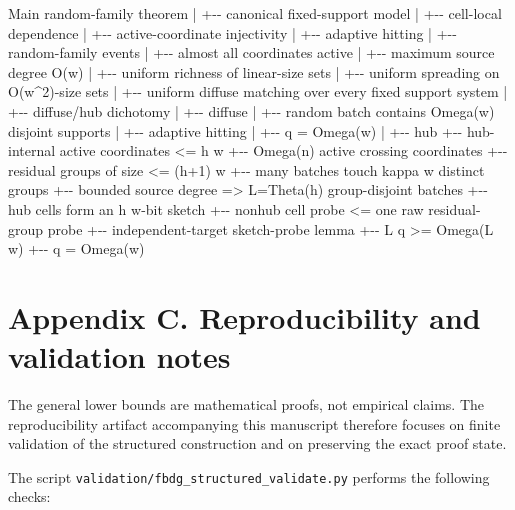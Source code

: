 \documentclass[
]{article}
\newenvironment{Shaded}{}{}
\newcommand{\NormalTok}[1]{#1}
\begin{document}
\begin{Shaded}
\begin{Highlighting}[]
\NormalTok{Main random{-}family theorem}
\NormalTok{|}
\NormalTok{+{-}{-} canonical fixed{-}support model}
\NormalTok{|   +{-}{-} cell{-}local dependence}
\NormalTok{|   +{-}{-} active{-}coordinate injectivity}
\NormalTok{|   +{-}{-} adaptive hitting}
\NormalTok{|}
\NormalTok{+{-}{-} random{-}family events}
\NormalTok{|   +{-}{-} almost all coordinates active}
\NormalTok{|   +{-}{-} maximum source degree O(w)}
\NormalTok{|   +{-}{-} uniform richness of linear{-}size sets}
\NormalTok{|   +{-}{-} uniform spreading on O(w\^{}2){-}size sets}
\NormalTok{|   +{-}{-} uniform diffuse matching over every fixed support system}
\NormalTok{|}
\NormalTok{+{-}{-} diffuse/hub dichotomy}
\NormalTok{    |}
\NormalTok{    +{-}{-} diffuse}
\NormalTok{    |   +{-}{-} random batch contains Omega(w) disjoint supports}
\NormalTok{    |   +{-}{-} adaptive hitting}
\NormalTok{    |   +{-}{-} q = Omega(w)}
\NormalTok{    |}
\NormalTok{    +{-}{-} hub}
\NormalTok{        +{-}{-} hub{-}internal active coordinates \textless{}= h w}
\NormalTok{        +{-}{-} Omega(n) active crossing coordinates}
\NormalTok{        +{-}{-} residual groups of size \textless{}= (h+1) w}
\NormalTok{        +{-}{-} many batches touch kappa w distinct groups}
\NormalTok{        +{-}{-} bounded source degree =\textgreater{} L=Theta(h) group{-}disjoint batches}
\NormalTok{        +{-}{-} hub cells form an h w{-}bit sketch}
\NormalTok{        +{-}{-} nonhub cell probe \textless{}= one raw residual{-}group probe}
\NormalTok{        +{-}{-} independent{-}target sketch{-}probe lemma}
\NormalTok{        +{-}{-} L q \textgreater{}= Omega(L w)}
\NormalTok{        +{-}{-} q = Omega(w)}
\end{Highlighting}
\end{Shaded}

\hypertarget{appendix-c.-reproducibility-and-validation-notes}{%
\section{Appendix C. Reproducibility and validation
notes}\label{appendix-c.-reproducibility-and-validation-notes}}

The general lower bounds are mathematical proofs, not empirical claims.
The reproducibility artifact accompanying this manuscript therefore
focuses on finite validation of the structured construction and on
preserving the exact proof state.

The script \texttt{validation/fbdg\_structured\_validate.py} performs
the following checks:
\end{document}
